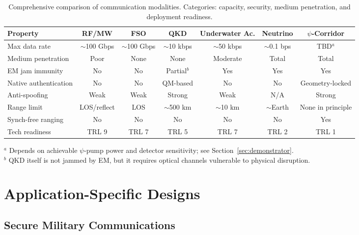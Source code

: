 \documentclass[twocolumn,superscriptaddress,prd,nofootinbib]{revtex4-2}
\begin{document}
\begin{table}[t]
\caption{Comprehensive comparison of communication modalities.
Categories: capacity, security, medium penetration, and deployment
readiness.}
\label{tab:comparison}
\begin{ruledtabular}
\begin{tabular}{lcccccc}
Property & RF/MW & FSO & QKD & Underwater Ac. & Neutrino &
$\psi$-Corridor \\
\hline
Max data rate & $\sim$100 Gbps & $\sim$100 Gbps & $\sim$10 kbps &
$\sim$50 kbps & $\sim$0.1 bps & TBD$^a$ \\
Medium penetration & Poor & None & None & Moderate & Total & Total \\
EM jam immunity & No & No & Partial$^b$ & Yes & Yes & Yes \\
Native authentication & No & No & QM-based & No & No & Geometry-locked \\
Anti-spoofing & Weak & Weak & Strong & Weak & N/A & Strong \\
Range limit & LOS/reflect & LOS & $\sim$500 km & $\sim$10 km &
$\sim$Earth & None in principle \\
Synch-free ranging & No & No & No & No & No & Yes \\
Tech readiness & TRL 9 & TRL 7 & TRL 5 & TRL 7 & TRL 2 & TRL 1 \\
\end{tabular}
\end{ruledtabular}
\begin{flushleft}
\footnotesize{$^a$ Depends on achievable $\psi$-pump power and detector
sensitivity; see Section~\ref{sec:demonstrator}.\\
$^b$ QKD itself is not jammed by EM, but it requires optical channels
vulnerable to physical disruption.}
\end{flushleft}
\end{table}

\section{Application-Specific Designs}\label{sec:applications}

\subsection{Secure Military Communications}
\end{document}
